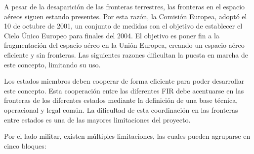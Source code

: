 A pesar de la desaparición de las fronteras terrestres, las fronteras en el espacio aéreos siguen estando presentes. Por esta razón, la Comisión Europea, adoptó el 10 de octubre de 2001, un conjunto de medidas con el objetivo de establecer el Cielo Único Europeo para finales del 2004. El objetivo es poner fin a la fragmentación del espacio aéreo en la Unión Europea, creando un espacio aéreo eficiente y sin fronteras. Las siguientes razones dificultan la puesta en marcha de este concepto, limitando su uso.  

Los estados miembros deben cooperar de forma eficiente para poder desarrollar este concepto. Esta cooperación entre las diferentes FIR debe acentuarse en las fronteras de los diferentes estados mediante la definición de una base técnica, operacional y legal común. La dificultad de esta coordinación en las fronteras entre estados es una de las mayores limitaciones del proyecto.

Por el lado militar, existen múltiples limitaciones, las cuales pueden agruparse en cinco bloques:

